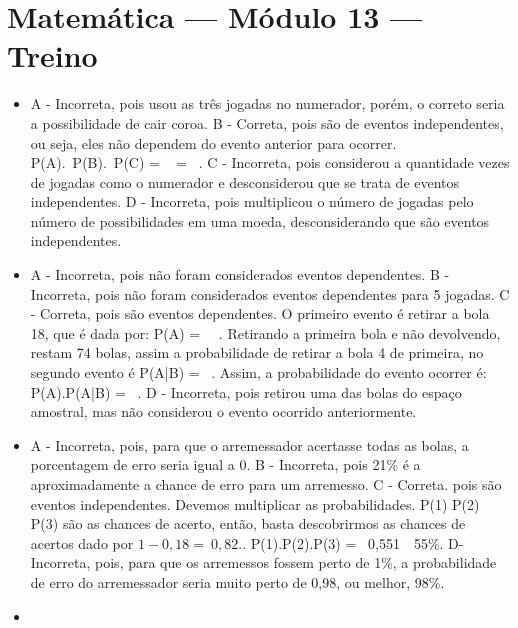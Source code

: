 \section*{Matemática — Módulo 13 — Treino}

\begin{itemize}
\item A - Incorreta, pois usou as três jogadas no numerador, porém, o correto
seria a possibilidade de cair coroa.
B - Correta, pois são de eventos independentes, ou seja, eles não
dependem do evento anterior para ocorrer. P(A).\ P(B).\ P(C) = \  \times {} \times {} = \ .
C - Incorreta, pois considerou a quantidade vezes de jogadas como o
numerador e desconsiderou que se trata de eventos independentes.
D - Incorreta, pois multiplicou o número de jogadas pelo número de
possibilidades em uma moeda, desconsiderando que são eventos
independentes.
\item A - Incorreta, pois não foram considerados eventos dependentes.
B - Incorreta, pois não foram considerados eventos dependentes para 5
jogadas.
C - Correta, pois são eventos dependentes. O primeiro evento é retirar a
bola 18, que é dada por: P(A) = \ \ . Retirando a
primeira bola e não devolvendo, restam 74 bolas, assim a probabilidade
de retirar a bola 4 de primeira, no segundo evento é
P(A|B) = \ . Assim, a probabilidade do evento ocorrer é:
P(A).P(A|B) = \ .
D - Incorreta, pois retirou uma das bolas do espaço amostral, mas não
considerou o evento ocorrido anteriormente.
\item A - Incorreta, pois, para que o arremessador acertasse todas as bolas, a
porcentagem de erro seria igual a 0.
B - Incorreta, pois 21\% é a aproximadamente a chance de erro para um
arremesso.
C - Correta. pois são eventos independentes. Devemos multiplicar as
probabilidades. P(1) P(2) P(3) são as chances de acerto, então, basta
descobrirmos as chances de acertos dado por \(1 - 0,18 = \ 0,82.\). P(1).P(2).P(3) = \ 0,551\ \ 55\%.
D- Incorreta, pois, para que os arremessos fossem perto de 1\%, a
probabilidade de erro do arremessador seria muito perto de 0,98, ou
melhor, 98\%.
\item 
\end{itemize}


